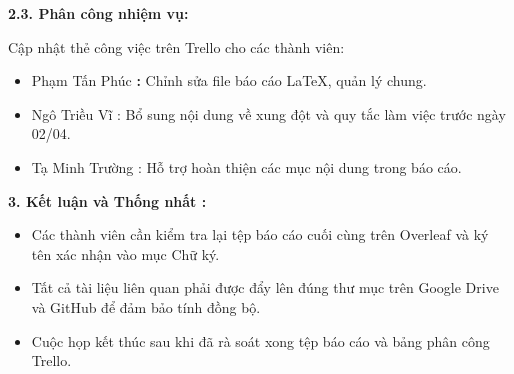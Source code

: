 \documentclass[12pt,a4paper]{article}
\newcommand{\subsecheading}[1]{%
    \par\vspace{2pt}%
    \hspace{1.5em}\textbf{#1}%
    \par\vspace{2pt}%
}
\newcommand{\introtext}[1]{%
    \par\hspace{3.0em}#1\par%
}
\begin{document}
\subsecheading{2.3. Phân công nhiệm vụ:}
\introtext{Cập nhật thẻ công việc trên Trello cho các thành viên:}
\begin{itemize}[leftmargin=3.3em]
    \item[o] Phạm Tấn Phúc \textbf{:} Chỉnh sửa file báo cáo LaTeX, quản lý chung.
    \item[o] Ngô Triều Vĩ : Bổ sung nội dung về xung đột và quy tắc làm việc trước ngày 02/04.
    \item[o] Tạ Minh Trường :  Hỗ trợ hoàn thiện các mục nội dung trong báo cáo.
\end{itemize}

\vspace{2pt}
\textbf{3. Kết luận và Thống nhất :}
\begin{itemize}
    \item Các thành viên cần kiểm tra lại tệp báo cáo cuối cùng trên Overleaf
          và ký tên xác nhận vào mục Chữ ký.
    \item Tất cả tài liệu liên quan phải được đẩy lên đúng thư mục trên Google
          Drive và GitHub để đảm bảo tính đồng bộ.
    \item Cuộc họp kết thúc sau khi đã rà soát xong tệp báo cáo và bảng phân công Trello.
\end{itemize}
\end{document}

